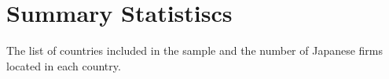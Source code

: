 \section{Summary Statistiscs}

\begin{table}[!ht]
\centering

\caption{The list of countries included in the sample and the number of Japanese firms located in each country.}
\label{tab:list_of_countries}
\end{table}
